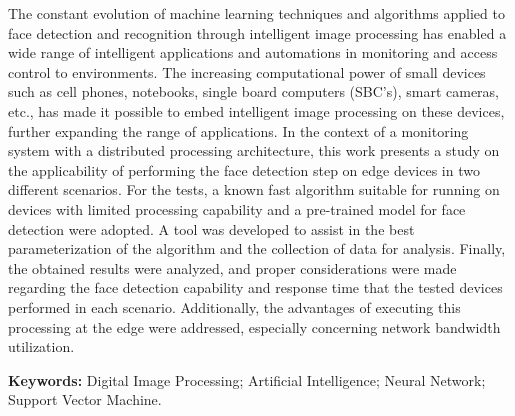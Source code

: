 \captionsenglish

\begin{resumo}
    The constant evolution of machine learning techniques and algorithms applied to face detection and recognition through intelligent image processing has enabled a wide range of intelligent applications and automations in monitoring and access control to environments. The increasing computational power of small devices such as cell phones, notebooks, single board computers (SBC's), smart cameras, etc., has made it possible to embed intelligent image processing on these devices, further expanding the range of applications. In the context of a monitoring system with a distributed processing architecture, this work presents a study on the applicability of performing the face detection step on edge devices in two different scenarios. For the tests, a known fast algorithm suitable for running on devices with limited processing capability and a pre-trained model for face detection were adopted. A tool was developed to assist in the best parameterization of the algorithm and the collection of data for analysis. Finally, the obtained results were analyzed, and proper considerations were made regarding the face detection capability and response time that the tested devices performed in each scenario. Additionally, the advantages of executing this processing at the edge were addressed, especially concerning network bandwidth utilization. 
 \vspace{0.5cm}
 
 \textbf{Keywords:} Digital Image Processing; Artificial Intelligence; Neural Network; Support Vector Machine. 
\end{resumo}
\captionsbrazil